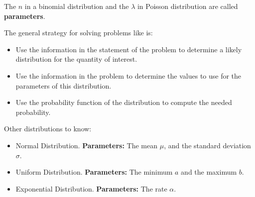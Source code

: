 %
\begin{frame}
The $n$ in a binomial distribution and the $\lambda$ in Poisson distribution are
called \textbf{parameters}.

The general strategy for solving problems like is:

\begin{itemize}
\item Use the information in the statement of the problem to determine a likely
distribution for the quantity of interest.
\item Use the information in the problem to determine the values to use for the
parameters of this distribution.
\item Use the probability function of the distribution to compute the needed
probability.
\end{itemize}

\end{frame}
%

%
\begin{frame}

Other distributions to know:

\begin{itemize}
\item Normal Distribution.  \textbf{Parameters:} The mean $\mu$, and the
standard deviation $\sigma$.
\item Uniform Distribution. \textbf{Parameters:} The minimum $a$ and the maximum
$b$.
\item Exponential Distribution. \textbf{Parameters:} The rate $\alpha$.
\end{itemize}

\end{frame}
